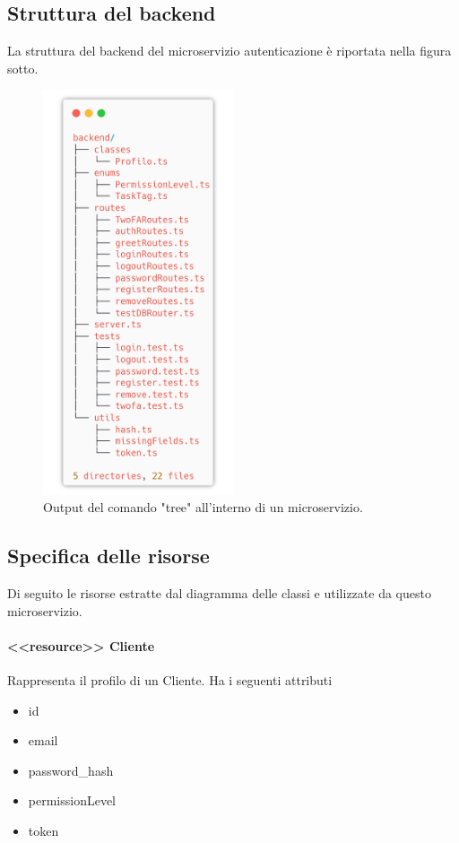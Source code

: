 \documentclass{report}
\begin{document}
\subsection{Struttura del backend}
La struttura del backend del microservizio autenticazione è riportata
nella figura sotto.
\begin{figure}[H]
	\centering\includegraphics[width=0.5\textwidth]{images/microservizio-autenticazione/backend-structure.png}
	\caption{Output del comando "tree" all'interno di un microservizio.}
\end{figure}





\subsection{Specifica delle risorse}
Di seguito le risorse estratte dal diagramma delle classi e utilizzate da questo microservizio.
\paragraph*{<<resource>> Cliente}
Rappresenta il profilo di un Cliente.
Ha i seguenti attributi
\begin{itemize}
	\item id
	\item email
	\item password\_hash
	\item permissionLevel
	\item token
\end{itemize}
\end{document}
